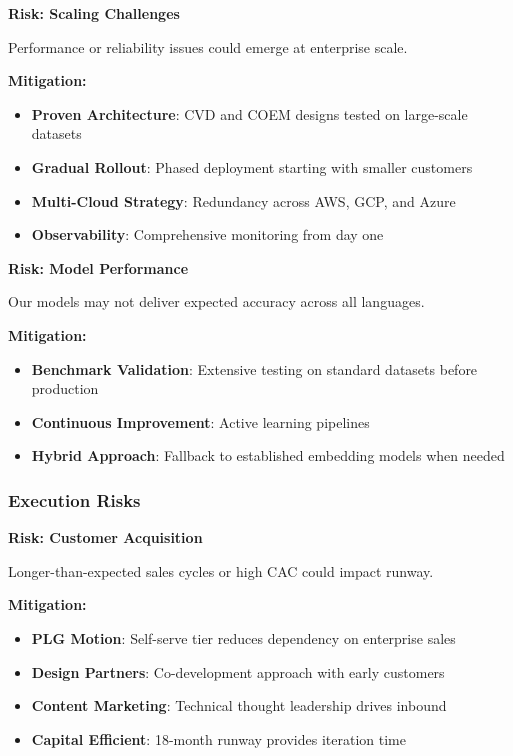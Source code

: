 \textbf{Risk: Scaling Challenges}

Performance or reliability issues could emerge at enterprise scale.

\textbf{Mitigation:}
\begin{itemize}[noitemsep]
    \item \textbf{Proven Architecture}: CVD and COEM designs tested on large-scale datasets
    \item \textbf{Gradual Rollout}: Phased deployment starting with smaller customers
    \item \textbf{Multi-Cloud Strategy}: Redundancy across AWS, GCP, and Azure
    \item \textbf{Observability}: Comprehensive monitoring from day one
\end{itemize}

\textbf{Risk: Model Performance}

Our models may not deliver expected accuracy across all languages.

\textbf{Mitigation:}
\begin{itemize}[noitemsep]
    \item \textbf{Benchmark Validation}: Extensive testing on standard datasets before production
    \item \textbf{Continuous Improvement}: Active learning pipelines
    \item \textbf{Hybrid Approach}: Fallback to established embedding models when needed
\end{itemize}

\subsubsection{Execution Risks}

\textbf{Risk: Customer Acquisition}

Longer-than-expected sales cycles or high CAC could impact runway.

\textbf{Mitigation:}
\begin{itemize}[noitemsep]
    \item \textbf{PLG Motion}: Self-serve tier reduces dependency on enterprise sales
    \item \textbf{Design Partners}: Co-development approach with early customers
    \item \textbf{Content Marketing}: Technical thought leadership drives inbound
    \item \textbf{Capital Efficient}: 18-month runway provides iteration time
\end{itemize}

